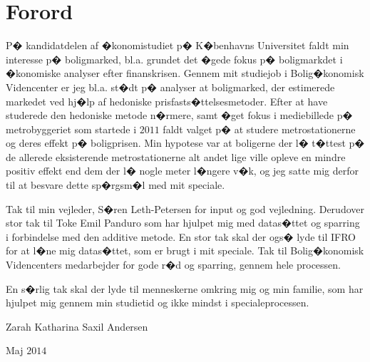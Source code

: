 \section*{Forord}
P� kandidatdelen af �konomistudiet p� K�benhavns Universitet  faldt min 
interesse p� boligmarked, bl.a. grundet det �gede fokus p� boligmarkdet i �konomiske 
analyser efter finanskrisen. Gennem mit studiejob i Bolig�konomisk Videncenter er 
jeg bl.a. st�dt p� analyser at boligmarked, der estimerede markedet ved hj�lp af hedoniske 
prisfasts�ttelsesmetoder. Efter at have studerede den hedoniske metode n�rmere, 
samt �get fokus i mediebillede p� metrobyggeriet som startede i $2011$ faldt valget p� at studere metrostationerne og deres effekt p� boligprisen. Min hypotese var at boligerne der l� t�ttest p� de allerede eksisterende metrostationerne alt andet lige ville opleve en mindre positiv effekt end dem der l� nogle meter l�ngere v�k, og jeg satte mig derfor til at besvare dette sp�rgsm�l med mit speciale. 

Tak til min vejleder, S�ren Leth-Petersen for input  og god vejledning. Derudover stor tak til Toke Emil Panduro som har hjulpet mig med datas�ttet og sparring i forbindelse med den additive metode. En stor tak skal der ogs� lyde til IFRO for at l�ne mig datas�ttet, som er brugt i mit speciale. Tak til Bolig�konomisk Videncenters medarbejder for gode r�d og sparring, gennem hele processen. 

En s�rlig tak skal der lyde til menneskerne omkring mig og min familie, som har hjulpet mig gennem min studietid og ikke mindst i specialeprocessen.  
\

\begin{flushright}
Zarah Katharina Saxil Andersen

Maj $2014$
\end{flushright}
